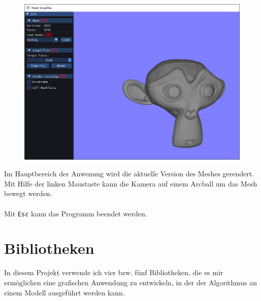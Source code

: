 \documentclass[a4paper,12pt]{article}
\begin{document}
\begin{figure}[h]
	\centering
	\includegraphics[width=\linewidth]{gui.png}
\end{figure}

Im Hauptbereich der Anwenung wird die aktuelle Version des Meshes gerendert. Mit Hilfe der linken Maustaste kann die Kamera auf einem Arcball um das Mesh bewegt werden.
\\
\\
Mit \texttt{Esc} kann das Programm beendet werden.

\section*{Bibliotheken}

In diesem Projekt verwende ich vier bzw. fünf Bibliotheken, die es mir ermöglichen eine grafischen Anwendung zu entwickeln, in der der Algorithmus an einem Modell ausgeführt werden kann.
\end{document}

